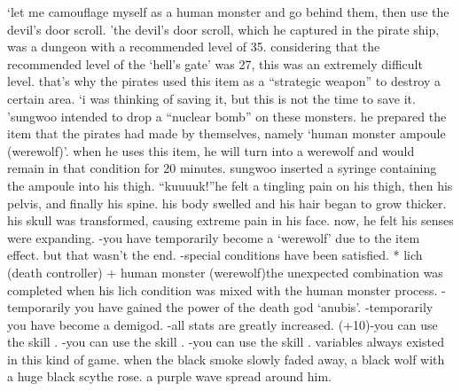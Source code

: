‘let me camouflage myself as a human monster and go behind them, then use the devil’s door scroll.
’the devil’s door scroll, which he captured in the pirate ship, was a dungeon with a recommended level of 35.
 considering that the recommended level of the ‘hell’s gate’ was 27, this was an extremely difficult level.
 that’s why the pirates used this item as a “strategic weapon” to destroy a certain area.
‘i was thinking of saving it, but this is not the time to save it.
’sungwoo intended to drop a “nuclear bomb” on these monsters.
he prepared the item that the pirates had made by themselves, namely ‘human monster ampoule (werewolf)’.
 when he uses this item, he will turn into a werewolf and would remain in that condition for 20 minutes.
sungwoo inserted a syringe containing the ampoule into his thigh.
“kuuuuk!”he felt a tingling pain on his thigh, then his pelvis, and finally his spine.
 his body swelled and his hair began to grow thicker.
 his skull was transformed, causing extreme pain in his face.
 now, he felt his senses were expanding.
-you have temporarily become a ‘werewolf’ due to the item effect.
but that wasn’t the end.
-special conditions have been satisfied.
* lich (death controller) + human monster (werewolf)the unexpected combination was completed when his lich condition was mixed with the human monster process.
-temporarily you have gained the power of the death god ‘anubis’.
-temporarily you have become a demigod.
-all stats are greatly increased.
 (+10)-you can use the skill .
-you can use the skill .
-you can use the skill .
variables always existed in this kind of game.
when the black smoke slowly faded away, a black wolf with a huge black scythe rose.
a purple wave spread around him.


 